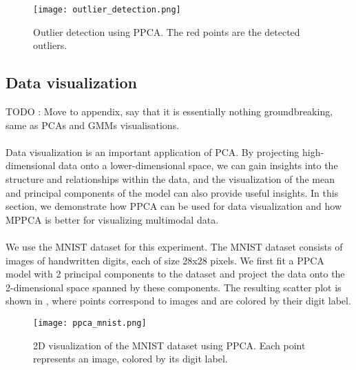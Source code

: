 \documentclass{article}
\begin{document}
\begin{figure}[H]
    \centering
    \texttt{[image: outlier\_detection.png]}
    \caption{Outlier detection using PPCA. The red points are the detected outliers.}
    \label{fig:outlier_detection}
\end{figure}

\subsection{Data visualization}

TODO : Move to appendix, say that it is essentially nothing groundbreaking, same as PCAs and GMMs visualisations.




\paragraph{} Data visualization is an important application of PCA. By projecting high-dimensional data onto a lower-dimensional space, we can gain insights into the structure and relationships within the data, and the visualization of the mean and principal components of the model can also provide useful insights. In this section, we demonstrate how PPCA can be used for data visualization and how MPPCA is better for visualizing multimodal data.

\paragraph{} We use the MNIST dataset for this experiment. The MNIST dataset consists of images of handwritten digits, each of size 28x28 pixels. We first fit a PPCA model with 2 principal components to the dataset and project the data onto the 2-dimensional space spanned by these components. The resulting scatter plot is shown in , where points correspond to images and are colored by their digit label.

\begin{figure}[H]
    \centering
    \texttt{[image: ppca\_mnist.png]}
    \caption{2D visualization of the MNIST dataset using PPCA. Each point represents an image, colored by its digit label.}
    \label{fig:ppca_mnist}
\end{figure}
\end{document}

